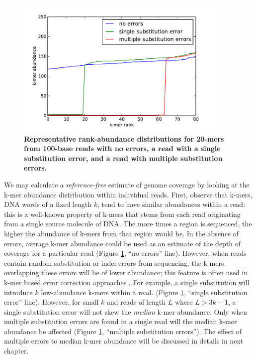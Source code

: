 \begin{figure}[!ht]
\centerline{\includegraphics[width=4in]{diginorm-ranks.pdf}} \caption{ {\bf
Representative rank-abundance distributions for 20-mers from 100-base reads
with no errors, a read with a single substitution error, and a read with
multiple substitution errors.}} \label{fig:rankabund} \end{figure}

We may calculate a {\em reference-free} estimate of genome coverage by looking
at the k-mer abundance distribution within individual reads. First, observe
that k-mers, DNA words of a fixed length $k$, tend to have similar abundances
within a read: this is a well-known property of k-mers that stems from each
read originating from a single source molecule of DNA.  The more times a region
is sequenced, the higher the abundance of k-mers from that region would be.  In
the absence of errors, average k-mer abundance could be used as an estimate of
the depth of coverage for a particular read (Figure \ref{fig:rankabund}, ``no
errors'' line).  However, when reads contain random substitution or indel
errors from sequencing, the k-mers overlapping these errors will be of lower
abundance; this feature is often used in k-mer based error correction
approaches \cite{Kelley2010}.  For example, a single substitution will
introduce $k$ low-abundance k-mers within a read.  (Figure \ref{fig:rankabund},
``single substitution error'' line).  However, for small $k$ and reads of
length $L$ where $L > 3k-1$, a single substitution error will not skew the {\em
median} k-mer abundance.  Only when multiple substitution errors are found in a
single read will the median k-mer abundance be affected (Figure
\ref{fig:rankabund}, ``multiple substitution errors''). The effect of multiple
errors to median k-mer abundance will be discussed in details in next chapter.


